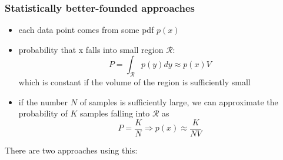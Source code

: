 \documentclass{article}
\begin{document}
\subsubsection{Statistically better-founded approaches}

\begin{itemize}
  \item each data point comes from some pdf $p(x)$
  \item probability that x falls into small region $\mathcal{R}$:
  \[
    P = \int_\mathcal{R} p(y) dy \approx p(x)V
  \]
  which is constant if the volume of the region is sufficiently small
  \item if the number $N$ of samples is sufficiently large, we can approximate the probability of $K$ samples falling into $\mathcal{R}$ as
  \[
    P = \frac{K}{N} \Rightarrow p(x) \approx \frac{K}{NV}
  \]
\end{itemize}

There are two approaches using this:
\end{document}
